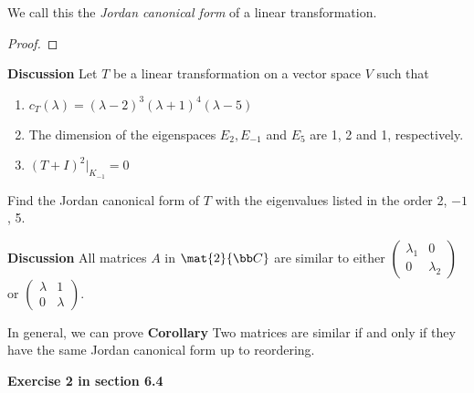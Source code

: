 \documentclass[letterpaper, 10pt]{article}
\begin{document}
\lb
We call this the \emph{Jordan canonical form} of a linear transformation.
\lb
\begin{proof}
\end{proof}


\vspace{200pt}
\lb
\textbf{Discussion}
\lb
Let $T$ be a linear transformation on a vector space $V$ such that
\begin{enumerate}
    \item $c_T(λ) = (λ-2)^3 (λ+1)^4(λ-5)$
    \item The dimension of the eigenspaces $E_2, E_{-1}$ and $E_5$ are 1, 2 and 1, respectively.
    \item $(T+I)^2 \vert_{K_{-1}} = 0$
\end{enumerate}
Find the Jordan canonical form of $T$ with the eigenvalues listed in the order 2, $-1$, 5.




\newpage
\lb
\textbf{Discussion}
\lb
All matrices $A$ in $\mat{2}{\bb C}$ are similar to either
$ \begin{pmatrix} λ_1 & 0 \\ 0 & λ_2 \end{pmatrix} $ or
$ \begin{pmatrix} λ & 1 \\ 0 & λ \end{pmatrix} $.


\vspace{300pt}
\lb
In general, we can prove
\lb
\textbf{Corollary}
\lb
Two matrices are similar if and only if they have the same Jordan
canonical form up to reordering.

\newpage
\lb
\textbf{Exercise 2 in section 6.4}
\lb

\end{document}

